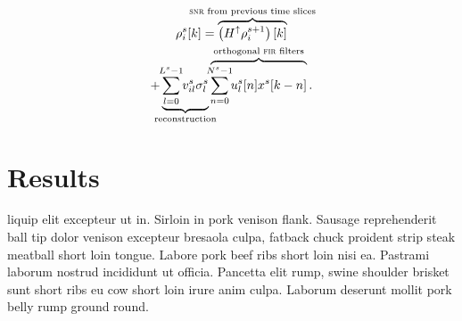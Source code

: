 \documentclass[portrait,plainboxedsections]{sciposter}
\begin{document}
\begin{minipage}[t]{0.5\textwidth}
\begin{multline}
	\rho_i^s [k] =%
		\overbrace{
			\left(H^\uparrow \rho_i^{s+1}\right)[k]
		}^\textrm{\clap{{\sc snr} from previous time slices}} \\
		+
		\underbrace{
			\sum_{\mathclap{l=0}}^{\mathclap{L^s-1}} v_{il}^s \sigma_l^s
		}_\textrm{\clap{reconstruction}}
		\overbrace{
			\sum_{\mathclap{n=0}}^{\mathclap{N^s-1}} u_l^s[n] x^s[k-n]
		}^\textrm{\clap{orthogonal {\sc fir} filters}} .
\end{multline}

\section*{Results}

liquip elit excepteur ut in. Sirloin in pork venison flank. Sausage reprehenderit ball tip dolor venison excepteur bresaola culpa, fatback chuck proident strip steak meatball short loin tongue. Labore pork beef ribs short loin nisi ea. Pastrami laborum nostrud incididunt ut officia. Pancetta elit rump, swine shoulder brisket sunt short ribs eu cow short loin irure anim culpa. Laborum deserunt mollit pork belly rump ground round.

\end{minipage}%
\end{document}
